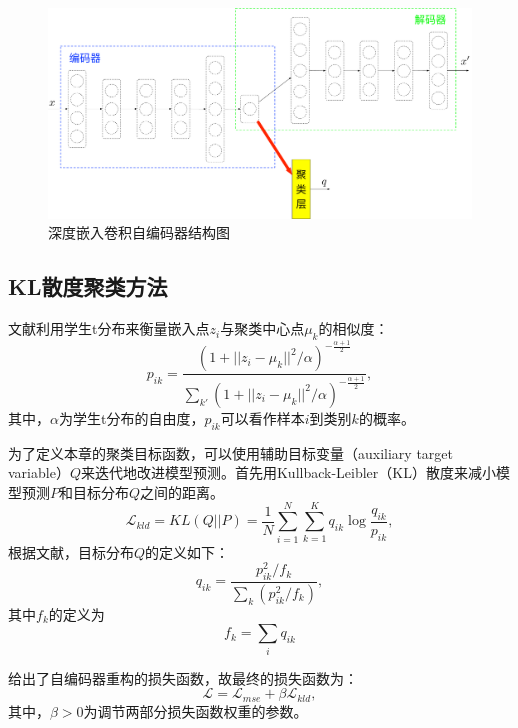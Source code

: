 \begin{figure}[hbt]
	\centering
	\includegraphics[width=13.5cm]{figures/AE/decc}
	\caption{深度嵌入卷积自编码器结构图}
	\label{fig:decc}
\end{figure}

\subsection{KL散度聚类方法}
文献\cite{maaten2008visualizing}利用学生t分布来衡量嵌入点$z_i$与聚类中心点$\mu_k$的相似度：
\begin{equation}
p_{ik}=\frac{(1+||z_i-\mu_k||^2/\alpha)^{-\frac{\alpha+1}{2}}}{\sum_{k'}(1+||z_i-\mu_k||^2/\alpha)^{-\frac{\alpha+1}{2}}},
	\label{equ:p}
\end{equation}
其中，$\alpha$为学生t分布的自由度，$p_{ik}$可以看作样本$i$到类别$k$的概率。

为了定义本章的聚类目标函数，可以使用辅助目标变量（auxiliary target variable）$Q$来迭代地改进模型预测。首先用Kullback-Leibler（KL）散度来减小模型预测$P$和目标分布$Q$之间的距离。
\begin{equation}
	\mathscr{L}_{kld}=KL(Q||P)=\frac{1}{N}\sum_{i=1}^{N}\sum_{k=1}^{K}q_{ik}\log{\frac{q_{ik}}{p_{ik}}},
	\label{equ:kldfirst}
\end{equation}
根据文献\cite{xie2016unsupervised}，目标分布$Q$的定义如下：
\begin{equation}
	q_{ik}=\frac{p_{ik}^2/f_k}{\sum_k(p_{ik}^2/f_k)},
	\label{equ:traget_distribution}
\end{equation}
其中$f_k$的定义为
\begin{equation}
	f_k=\sum_iq_{ik}
\end{equation}

给出了自编码器重构的损失函数，故最终的损失函数为：
\begin{equation}
	\mathscr{L}=\mathscr{L}_{mse}+\beta \mathscr{L}_{kld},
	\label{equ:l_last}
\end{equation}
其中，$\beta > 0$为调节两部分损失函数权重的参数。

